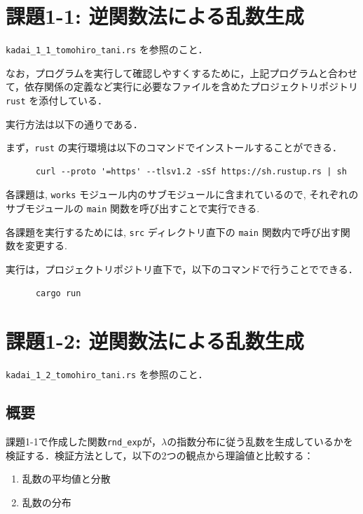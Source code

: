 \documentclass[fleqn, a4paper. 12pt]{jsarticle}
\begin{document}
  \newpage
  \section*{課題1-1: 逆関数法による乱数生成}

    \texttt{kadai\_1\_1\_tomohiro\_tani.rs} を参照のこと．

    \quad

    なお，プログラムを実行して確認しやすくするために，上記プログラムと合わせて，依存関係の定義など実行に必要なファイルを含めたプロジェクトリポジトリ \texttt{rust} を添付している．

    実行方法は以下の通りである．

    まず，\texttt{rust} の実行環境は以下のコマンドでインストールすることができる．

    \begin{verbatim}
      curl --proto '=https' --tlsv1.2 -sSf https://sh.rustup.rs | sh
    \end{verbatim}

    各課題は, \texttt{works} モジュール内のサブモジュールに含まれているので, それぞれのサブモジュールの \texttt{main} 関数を呼び出すことで実行できる.

    各課題を実行するためには, \texttt{src} ディレクトリ直下の \texttt{main} 関数内で呼び出す関数を変更する.

    実行は，プロジェクトリポジトリ直下で，以下のコマンドで行うことでできる．

    \begin{verbatim}
      cargo run
    \end{verbatim}

  \newpage
  \section*{課題1-2: 逆関数法による乱数生成}

    \texttt{kadai\_1\_2\_tomohiro\_tani.rs} を参照のこと．

    \subsection*{概要}
    課題1-1で作成した関数\texttt{rnd\_exp}が，$\lambda$の指数分布に従う乱数を生成しているかを検証する．検証方法として，以下の2つの観点から理論値と比較する：
    \begin{enumerate}
        \item 乱数の平均値と分散
        \item 乱数の分布
    \end{enumerate}
\end{document}
